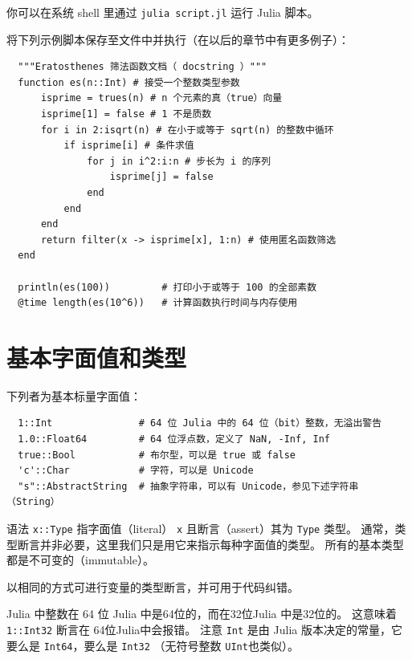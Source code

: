 \documentclass[10pt,a4paper]{article}
\begin{document}
你可以在系统 shell 里通过 \lstinline|julia script.jl| 运行 Julia 脚本。

将下列示例脚本保存至文件中并执行（在以后的章节中有更多例子）：
\begin{lstlisting}
  """Eratosthenes 筛法函数文档（ docstring ）"""
  function es(n::Int) # 接受一个整数类型参数
      isprime = trues(n) # n 个元素的真（true）向量
      isprime[1] = false # 1 不是质数
      for i in 2:isqrt(n) # 在小于或等于 sqrt(n) 的整数中循环
          if isprime[i] # 条件求值
              for j in i^2:i:n # 步长为 i 的序列
                  isprime[j] = false
              end
          end
      end
      return filter(x -> isprime[x], 1:n) # 使用匿名函数筛选
  end
  
  println(es(100))         # 打印小于或等于 100 的全部素数
  @time length(es(10^6))   # 计算函数执行时间与内存使用
\end{lstlisting}

\section{基本字面值和类型}
下列者为基本标量字面值：
\begin{lstlisting}
  1::Int               # 64 位 Julia 中的 64 位（bit）整数，无溢出警告
  1.0::Float64         # 64 位浮点数，定义了 NaN, -Inf, Inf
  true::Bool           # 布尔型，可以是 true 或 false
  'c'::Char            # 字符，可以是 Unicode
  "s"::AbstractString  # 抽象字符串，可以有 Unicode，参见下述字符串（String） 
\end{lstlisting}
语法 \lstinline|x::Type| 指字面值（literal） \lstinline|x| 且断言（assert）其为 \lstinline|Type| 类型。
通常，类型断言并非必要，这里我们只是用它来指示每种字面值的类型。
所有的基本类型都是不可变的（immutable）。

以相同的方式可进行变量的类型断言，并可用于代码纠错。

Julia 中整数在 64 位 Julia 中是64位的，而在32位Julia 中是32位的。
这意味着 \lstinline|1::Int32| 断言在 64位Julia中会报错。
注意 \lstinline|Int| 是由 Julia 版本决定的常量，它要么是 \lstinline|Int64|，要么是 \lstinline|Int32|
（无符号整数 \lstinline|UInt|也类似）。
\end{document}
